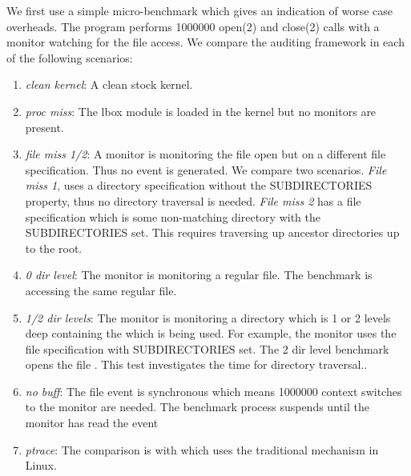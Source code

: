 We first use a simple micro-benchmark which gives an indication
of worse case overheads.
The program performs 1000000 open(2) and close(2) calls with
a monitor watching for the file access.
We compare the auditing framework in each of the following scenarios:
\begin{enumerate}

\item {\em clean kernel}:
A clean stock kernel.

\item {\em proc miss}:
The lbox module is loaded in the kernel but no monitors are present.

\item {\em file miss 1/2}:
A monitor is monitoring the file open but on a different file specification.
Thus no event is generated.
We compare two scenarios.
{\em File miss 1}, uses a directory specification without the
SUBDIRECTORIES property, thus no directory traversal is needed.
{\em File miss 2} has a file specification which is some non-matching
directory with the SUBDIRECTORIES set.
This requires traversing up ancestor directories up to the root.

\item {\em 0 dir level}:
The monitor is monitoring a regular file.
The benchmark is accessing the same regular file.

\item {\em 1/2 dir levels}:
The monitor is monitoring a directory which is 1 or 2 levels deep containing
the which is being used.
For example, the monitor uses the file specification
 with SUBDIRECTORIES set.
The 2 dir level benchmark opens the file .
This test investigates the time for directory traversal..

\item {\em no buff}:
The file event is synchronous which means 1000000 context switches
to the monitor are needed.
The benchmark process suspends until the monitor
has read the event

\item {\em ptrace}:
The comparison is with  which uses the traditional
 mechanism in Linux.

\end{enumerate}

